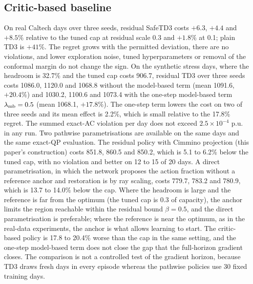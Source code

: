 \documentclass[11pt]{article}
\begin{document}
\subsection{Critic-based baseline}\label{sec:rl}
On real Caltech days over three seeds, residual SafeTD3 costs $+6.3$, $+4.4$ and $+8.5\%$ relative to the tuned cap at residual scale 0.3 and $+1.8\%$ at 0.1; plain TD3 is $+41\%$. The regret grows with the permitted deviation, there are no violations, and lower exploration noise, tuned hyperparameters or removal of the conformal margin do not change the sign. On the synthetic stress days, where the headroom is 32.7\% and the tuned cap costs 906.7, residual TD3 over three seeds costs 1086.0, 1120.0 and 1068.8 without the model-based term (mean 1091.6, $+20.4\%$) and 1030.2, 1100.6 and 1073.4 with the one-step model-based term $\lambda_{\rm mb}=0.5$ (mean 1068.1, $+17.8\%$). The one-step term lowers the cost on two of three seeds and its mean effect is 2.2\%, which is small relative to the 17.8\% regret. The summed exact-AC violation per day does not exceed $2.5\times10^{-4}$ p.u. in any run. Two pathwise parametrisations are available on the same days and the same exact-QP evaluation. The residual policy with Cimmino projection (this paper's construction) costs 851.8, 860.5 and 850.2, which is 5.1 to 6.2\% below the tuned cap, with no violation and better on 12 to 15 of 20 days. A direct parametrisation, in which the network proposes the action fraction without a reference anchor and restoration is by ray scaling, costs 779.7, 783.2 and 780.9, which is 13.7 to 14.0\% below the cap. Where the headroom is large and the reference is far from the optimum (the tuned cap is 0.3 of capacity), the anchor limits the region reachable within the residual bound $\beta=0.5$, and the direct parametrisation is preferable; where the reference is near the optimum, as in the real-data experiments, the anchor is what allows learning to start. The critic-based policy is 17.8 to 20.4\% worse than the cap in the same setting, and the one-step model-based term does not close the gap that the full-horizon gradient closes. The comparison is not a controlled test of the gradient horizon, because TD3 draws fresh days in every episode whereas the pathwise policies use 30 fixed training days.

\end{document}
